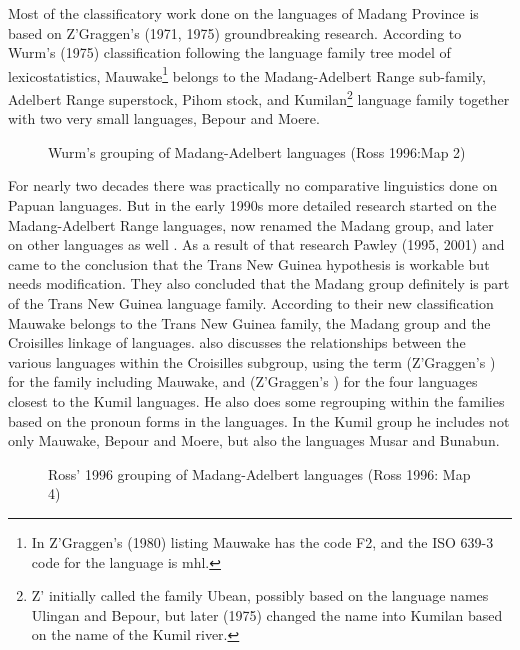 Most of the classificatory work done on the languages of Madang Province  is based on Z'Graggen's (1971, 1975) groundbreaking research.  According to Wurm's (1975) classification following the language family tree model of lexicostatistics, Mauwake\footnote{In Z'Graggen's (1980) listing Mauwake has the code F2, and the ISO 639-3 code for the language is mhl.} belongs to the Madang-Adelbert Range sub-family, Adelbert Range superstock, Pihom stock, and Kumilan\footnote{Z'\citet{Graggen1971} initially called the family Ubean, possibly based on the language names Ulingan and Bepour, but later (1975) changed the name into Kumilan based on the name of the Kumil river.} language family together with two very small languages, Bepour and Moere. 



\begin{figure}
\caption{Wurm's grouping of Madang-Adelbert languages (Ross 1996:Map 2)}
\label{fig:map:3}
\end{figure}

For nearly two decades there was practically no comparative linguistics done on Papuan languages.  But in the early 1990s more detailed research started on the Madang-Adelbert Range languages, now renamed the Madang group, and later on other  languages as well \citep{Pawley1998}. As a result of that research Pawley (1995, 2001) and \citet{Ross1995} came to the conclusion that the Trans New Guinea hypothesis is workable but needs modification. They also concluded that the Madang group definitely is part of the Trans New Guinea language family. According to their new classification Mauwake belongs to the Trans New Guinea family, the Madang group and the Croisilles linkage of languages. \citet[21-25]{Ross1996} also discusses the relationships between the various languages within the Croisilles subgroup, using the term  (Z'Graggen's   ) for the family including Mauwake, and  (Z'Graggen's  ) for the four languages closest to the Kumil languages. He also does some regrouping within the families based on the pronoun  forms in the languages.  In the Kumil group he includes not only Mauwake, Bepour and Moere, but also the languages Musar and Bunabun. 



\begin{figure}
\caption{Ross' 1996 grouping of Madang-Adelbert languages (Ross 1996: Map 4)}
\label{fig:map:4}
\end{figure}


